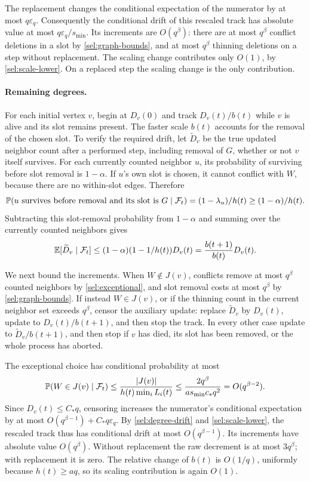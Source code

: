 The replacement changes the conditional expectation of the numerator
by at most $q\varepsilon_q$.  Consequently the conditional drift
of this rescaled track has absolute value at most
$q\varepsilon_q/s_{\min}$.  Its increments are $O(q^\beta)$:
there are at most $q^\beta$ conflict deletions in a slot by
\eqref{sel:graph-bounds}, and at most $q^\beta$ thinning deletions
on a step without replacement.  The scaling change contributes
only $O(1)$, by \eqref{sel:scale-lower}.  On a replaced step the
scaling change is the only contribution.

\paragraph{Remaining degrees.}
For each initial vertex $v$, begin at $D_v(0)$ and track
$D_v(t)/b(t)$ while $v$ is alive and its slot remains present.
The faster scale $b(t)$ accounts for the removal of the chosen slot.
To verify the required drift, let $\widetilde D_v$ be the true
updated neighbor count after a performed step, including removal of
$G$, whether or not $v$ itself survives.
For each currently counted neighbor $u$, its probability of
surviving before slot removal is $1-\alpha$.  If $u$'s own slot
is chosen, it cannot conflict with $W$, because there are no
within-slot edges.  Therefore
\[
 \mathbb P(u\hbox{ survives before removal and its slot is }G
       \mid\mathcal F_t)=(1-\lambda_u)/h(t)
       \ge(1-\alpha)/h(t).
\]
Subtracting this slot-removal probability from $1-\alpha$ and
summing over the currently counted neighbors gives
\begin{equation}\label{sel:degree-drift}
 \mathbb E[\widetilde D_v\mid\mathcal F_t]
 \le(1-\alpha)(1-1/h(t))D_v(t)
 =\frac{b(t+1)}{b(t)}D_v(t).
\end{equation}

We next bound the increments.  When $W\notin J(v)$, conflicts
remove at most $q^\beta$ counted neighbors by
\eqref{sel:exceptional}, and slot removal costs at most $q^\beta$
by \eqref{sel:graph-bounds}.  If instead $W\in J(v)$, or if the
thinning count in the current neighbor set exceeds $q^\beta$,
censor the auxiliary update: replace $\widetilde D_v$ by $D_v(t)$,
update to $D_v(t)/b(t+1)$, and then stop the track.  In every other
case update to $\widetilde D_v/b(t+1)$, and then stop if $v$ has
died, its slot has been removed, or the whole process has aborted.

The exceptional choice has conditional probability at most
\begin{equation}\label{sel:exception-probability}
 \mathbb P(W\in J(v)\mid\mathcal F_t)
 \le\frac{|J(v)|}{h(t)\min_iL_i(t)}
 \le\frac{2q^\beta}{a s_{\min}c_*q^2}
 =O(q^{\beta-2}).
\end{equation}
Since $D_v(t)\le C_*q$, censoring increases the numerator's
conditional expectation by at most
$O(q^{\beta-1})+C_*q\varepsilon_q$.  By
\eqref{sel:degree-drift} and \eqref{sel:scale-lower}, the rescaled
track thus has conditional drift at most $O(q^{\beta-1})$.
Its increments have absolute value $O(q^\beta)$.  Without
replacement the raw decrement is at most $3q^\beta$; with
replacement it is zero.  The relative change of $b(t)$ is
$O(1/q)$, uniformly because $h(t)\ge aq$, so its scaling
contribution is again $O(1)$.

